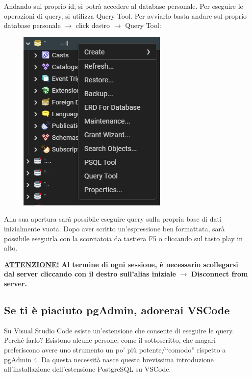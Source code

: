\documentclass[a4paper]{article}
\newcommand{\dquotes}[1]{``#1''}
\begin{document}
	\noindent
	Andando sul proprio id, si potrà accedere al database personale. Per eseguire le operazioni di query, si utilizza \textsf{Query Tool}. Per avviarlo basta andare sul proprio database personale $\rightarrow$ click destro $\rightarrow$ \textsf{Query Tool}:
	\begin{figure}[!htp]
		\centering
		\includegraphics[width=.5\textwidth]{img/lab/configurazione.png}
	\end{figure}
	
	\noindent
	Alla sua apertura sarà possibile eseguire query sulla propria base di dati inizialmente vuota. Dopo aver scritto un'espressione ben formattata, sarà possibile eseguirla con la scorciatoia da tastiera \textsf{F5} o cliccando sul tasto play in alto.\newline
	
	\noindent
	\textcolor{Red3}{\textbf{\underline{ATTENZIONE!}} \textbf{Al termine di ogni sessione, è necessario scollegarsi dal server cliccando con il destro sull'alias iniziale} $\rightarrow$ \textbf{\textsf{Disconnect from server}.}}\newpage
	
	\subsection{Se ti è piaciuto pgAdmin, adorerai VSCode}
	
	Su Visual Studio Code esiste un'estensione che consente di eseguire le query. Perché farlo? Esistono alcune persone, come il sottoscritto, che magari preferiscono avere uno strumento un po' più potente/\dquotes{comodo} rispetto a pgAdmin 4. Da questa necessità nasce questa brevissima introduzione all'installazione dell'estensione PostgreSQL su VSCode.\newline
	
\end{document}
